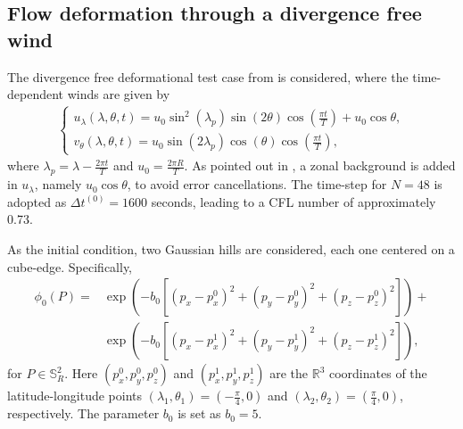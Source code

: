 \documentclass[preprint,12pt]{elsarticle}
\begin{document}
\begin{linenumbers}
\subsection{Flow deformation through a divergence free wind}
The divergence free deformational test case from \cite{nair:2010} is considered, where the time-dependent winds are given by
\begin{align}
	\label{ndiv-nair-wind}
	\begin{cases}
		u_\lambda(\lambda,\theta,t) =u_0\sin^2(\lambda_p)\sin(2\theta)\cos(\frac{\pi t}{T})+u_0\cos\theta,\\
		v_\theta(\lambda,\theta,t) = u_0\sin(2\lambda_p)\cos(\theta)\cos(\frac{\pi t}{T}),
	\end{cases}
\end{align}
where $\lambda_p=\lambda-\frac{2\pi t}{T}$ and $u_0 = \frac{2\pi R}{T}$. As pointed out in \cite{nair:2010}, a zonal background is added in $u_\lambda$, namely $u_0\cos\theta$, to avoid error cancellations.
The time-step for $N=48$ is adopted as $\Delta t^{(0)} = 1600$ seconds, leading to a CFL number of approximately 0.73.

As the initial condition, two Gaussian hills are considered, each one centered on a cube-edge. Specifically,
\begin{align}
\label{ndiv-nair-ic}
\phi_0(P) = 
&\exp(-b_0[(p_x-p_x^0)^2+ (p_y-p_y^0)^2 + (p_z-p_z^0)^2]) + \nonumber \\ 
&\exp(-b_0[(p_x-p_x^1)^2+ (p_y-p_y^1)^2 + (p_z-p_z^1)^2]),
\end{align}
for $P \in \mathbb{S}_R^2$.
Here $(p_x^0,p_y^0,p_z^0)$ and $(p_x^1,p_y^1,p_z^1)$ are the $\mathbb{R}^3$ coordinates of the latitude-longitude points
$(\lambda_1,\theta_1) = (-\frac{\pi}{4},0)$ and
$(\lambda_2,\theta_2) = ( \frac{\pi}{4},0)$, respectively.
The parameter $b_0$ is set as $b_0=5$.


\end{linenumbers}
\end{document}
